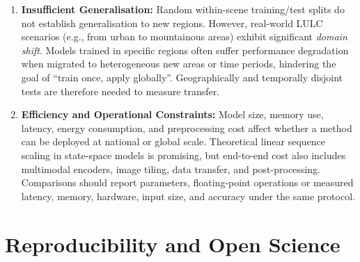 \documentclass[]{interact}
\theoremstyle{plain}%
\theoremstyle{definition}
\theoremstyle{remark}
\DeclareRobustCommand{\DIFadd}[1]{{\protect\color{DIFaddcolor}\uwave{#1}}}
\DeclareRobustCommand{\DIFdel}[1]{{\protect\color{DIFdelcolor}\sout{#1}}}
\def\DIFadd#1{#1}%
\def\DIFdel#1{}%
\begin{document}
\begin{enumerate}
	\item \textbf{Insufficient \DIFdel{Generalization} \DIFadd{Generalisation}:} \DIFdel{Most} \DIFdel{existing} \DIFdel{models} \DIFdel{follow} \DIFdel{the} \DIFdel{`}\DIFdel{`}\DIFdel{Independent} \DIFdel{and} \DIFdel{Identically} \DIFdel{Distributed''} \DIFdel{(}\DIFdel{IID}\DIFdel{)} \DIFdel{assumption} \DIFadd{Random} \DIFadd{within-scene} \DIFadd{training}\DIFadd{/}\DIFadd{test} \DIFadd{splits} \DIFadd{do} \DIFadd{not} \DIFadd{establish} \DIFadd{generalisation} \DIFadd{to} \DIFadd{new} \DIFadd{regions}. However, real-world LULC scenarios (e.g., from urban to mountainous areas) exhibit significant \textit{\DIFdel{Domain} \DIFdel{Shift}\hspace{0.33em}\DIFadd{domain} \DIFadd{shift}}. Models trained in specific regions often suffer performance degradation when migrated to heterogeneous new areas or time periods, hindering the goal of ``train once, apply globally''. \DIFadd{Geographically} \DIFadd{and} \DIFadd{temporally} \DIFadd{disjoint} \DIFadd{tests} \DIFadd{are} \DIFadd{therefore} \DIFadd{needed} \DIFadd{to} \DIFadd{measure} \DIFadd{transfer}\DIFadd{.} 
	\item \textbf{\DIFadd{Efficiency} \DIFadd{and} \DIFadd{Operational} \DIFadd{Constraints}\DIFadd{:}} \DIFadd{Model} \DIFadd{size}\DIFadd{,} \DIFadd{memory} \DIFadd{use}\DIFadd{,} \DIFadd{latency}\DIFadd{,} \DIFadd{energy} \DIFadd{consumption}\DIFadd{,} \DIFadd{and} \DIFadd{preprocessing} \DIFadd{cost} \DIFadd{affect} \DIFadd{whether} \DIFadd{a} \DIFadd{method} \DIFadd{can} \DIFadd{be} \DIFadd{deployed} \DIFadd{at} \DIFadd{national} \DIFadd{or} \DIFadd{global} \DIFadd{scale}\DIFadd{.} \DIFadd{Theoretical} \DIFadd{linear} \DIFadd{sequence} \DIFadd{scaling} \DIFadd{in} \DIFadd{state-space} \DIFadd{models} \DIFadd{is} \DIFadd{promising}\DIFadd{,} \DIFadd{but} \DIFadd{end-to-end} \DIFadd{cost} \DIFadd{also} \DIFadd{includes} \DIFadd{multimodal} \DIFadd{encoders}\DIFadd{,} \DIFadd{image} \DIFadd{tiling}\DIFadd{,} \DIFadd{data} \DIFadd{transfer}\DIFadd{,} \DIFadd{and} \DIFadd{post-processing}\DIFadd{.} \DIFadd{Comparisons} \DIFadd{should} \DIFadd{report} \DIFadd{parameters}\DIFadd{,} \DIFadd{floating-point} \DIFadd{operations} \DIFadd{or} \DIFadd{measured} \DIFadd{latency}\DIFadd{,} \DIFadd{memory}\DIFadd{,} \DIFadd{hardware}\DIFadd{,} \DIFadd{input} \DIFadd{size}\DIFadd{,} \DIFadd{and} \DIFadd{accuracy} \DIFadd{under} \DIFadd{the} \DIFadd{same} \DIFadd{protocol}\DIFadd{.}
\end{enumerate}


\section{\DIFadd{Reproducibility} \DIFadd{and} \DIFadd{Open} \DIFadd{Science}}
\end{document}
